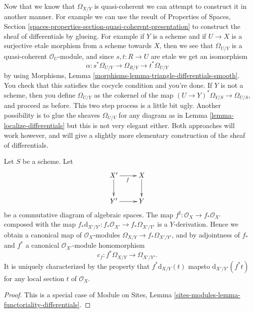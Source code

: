 \begin{remark}
\label{remark-alternative}
Now that we know that $\Omega_{X/Y}$ is quasi-coherent we can attempt
to construct it in another manner. For example we can use the result of
Properties of Spaces,
Section \ref{spaces-properties-section-quasi-coherent-presentation}
to construct the sheaf of differentials by glueing.
For example if $Y$ is a scheme and if $U \to X$ is a surjective etale morphism
from a scheme towards $X$, then we see that $\Omega_{U/Y}$ is
a quasi-coherent $\mathcal{O}_U$-module, and since $s, t : R \to U$
are etale we get an isomorphism
$$
\alpha : s^*\Omega_{U/Y} \to \Omega_{R/Y} \to t^*\Omega_{U/Y}
$$
by using
Morphisms, Lemma \ref{morphisms-lemma-triangle-differentials-smooth}.
You check that this satisfies the cocycle condition and you're done.
If $Y$ is not a scheme, then you define $\Omega_{U/Y}$ as the cokernel
of the map $(U \to Y)^*\Omega_{Y/S} \to \Omega_{U/S}$, and proceed as
before. This two step process is a little bit ugly. Another possibility
is to glue the sheaves $\Omega_{U/V}$ for any diagram as in
Lemma \ref{lemma-localize-differentials}
but this is not very elegant either. Both approaches will work however, and
will give a slightly more elementary construction of the sheaf of
differentials.
\end{remark}


\begin{lemma}
\label{lemma-functoriality-differentials}
Let $S$ be a scheme. Let
$$
\xymatrix{
X' \ar[d] \ar[r]_f & X \ar[d] \\
Y' \ar[r] & Y
}
$$
be a commutative diagram of algebraic spaces. The map
$f^\sharp : \mathcal{O}_X \to f_*\mathcal{O}_{X'}$ composed with the map
$f_*\text{d}_{X'/Y'} : f_*\mathcal{O}_{X'} \to f_*\Omega_{X'/Y'}$ is a
$Y$-derivation. Hence we obtain a canonical map of $\mathcal{O}_X$-modules
$\Omega_{X/Y} \to f_*\Omega_{X'/Y'}$, and by
adjointness of $f_*$ and $f^*$ a
canonical $\mathcal{O}_{X'}$-module homomorphism
$$
c_f : f^*\Omega_{X/Y} \longrightarrow \Omega_{X'/Y'}.
$$
It is uniquely characterized by the property that
$f^*\text{d}_{X/Y}(t)$ mapsto $\text{d}_{X'/Y'}(f^* t)$
for any local section $t$ of $\mathcal{O}_X$.
\end{lemma}

\begin{proof}
This is a special case of
Module on Sites, Lemma \ref{sites-modules-lemma-functoriality-differentials}.
\end{proof}










